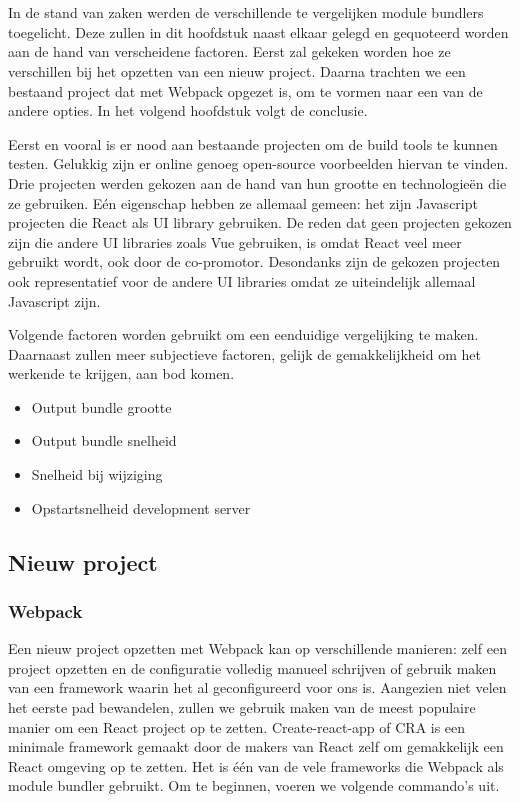 
\chapter{}
\label{ch:methodologie}

In de stand van zaken werden de verschillende te vergelijken module bundlers toegelicht. Deze zullen in dit hoofdstuk naast elkaar gelegd en gequoteerd worden aan de hand van verscheidene factoren. 
Eerst zal gekeken worden hoe ze verschillen bij het opzetten van een nieuw project. Daarna trachten we een bestaand project dat met Webpack opgezet is, om te vormen naar een van de andere opties. In het volgend hoofdstuk volgt de conclusie.

Eerst en vooral is er nood aan bestaande projecten om de build tools te kunnen testen. Gelukkig zijn er online genoeg open-source voorbeelden hiervan te vinden. Drie projecten werden gekozen aan de hand van hun grootte en technologieën die ze gebruiken. Eén eigenschap hebben ze allemaal gemeen: het zijn Javascript projecten die React als UI library gebruiken. De reden dat geen projecten gekozen zijn die andere UI libraries zoals Vue gebruiken, is omdat React veel meer gebruikt wordt, ook door de co-promotor. Desondanks zijn de gekozen projecten ook representatief voor de andere UI libraries omdat ze uiteindelijk allemaal Javascript zijn. 

Volgende factoren worden gebruikt om een eenduidige vergelijking te maken. Daarnaast zullen meer subjectieve factoren, gelijk de gemakkelijkheid om het werkende te krijgen, aan bod komen.
\begin{itemize}
    \item Output bundle grootte
    \item Output bundle snelheid
    \item Snelheid bij wijziging
    \item Opstartsnelheid development server
\end{itemize}

\section{Nieuw project}
\subsection{Webpack}
Een nieuw project opzetten met Webpack kan op verschillende manieren: zelf een project opzetten en de configuratie volledig manueel schrijven of gebruik maken van een framework waarin het al geconfigureerd voor ons is. Aangezien niet velen het eerste pad bewandelen, zullen we gebruik maken van de meest populaire manier om een React project op te zetten. Create-react-app of CRA is een minimale framework gemaakt door de makers van React zelf om gemakkelijk een React omgeving op te zetten. Het is één van de vele frameworks die Webpack als module bundler gebruikt. Om te beginnen, voeren we volgende commando’s uit. 


